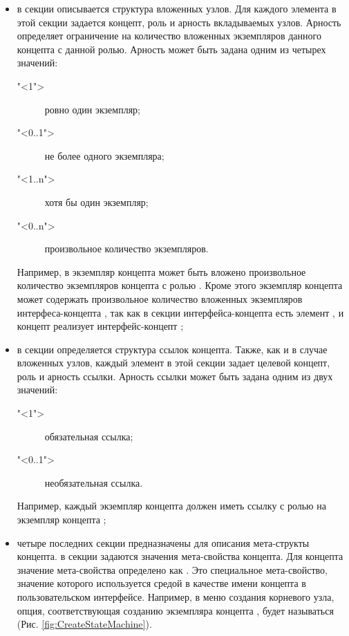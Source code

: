 \begin{itemize}
 \item в секции  описывается структура вложенных узлов. Для каждого элемента в этой секции задается концепт, роль и арность вкладываемых узлов. Арность определяет ограничение на количество вложенных экземпляров данного концепта с данной ролью. Арность может быть задана одним из четырех значений:
\begin{description}
 \item["<1">] ровно один экземпляр;
 \item["<0..1">] не более одного экземпляра;
 \item["<1..n">] хотя бы один экземпляр;
 \item["<0..n">] произвольное количество экземпляров.
\end{description}
Например, в экземпляр концепта  может быть вложено произвольное количество экземпляров концепта  с ролью . Кроме этого экземпляр концепта  может содержать произвольное количество вложенных экземпляров интерфеса-концепта , так как в секции  интерфейса-концепта  есть элемент , и концепт  реализует интерфейс-концепт ;

\item в секции  определяется структура ссылок концепта. Также, как и в случае вложенных узлов, каждый элемент в этой секции задает целевой концепт, роль и арность ссылки. Арность ссылки может быть задана одним из двух значений:
\begin{description}
 \item["<1">] обязательная ссылка;
 \item["<0..1">] необязательная ссылка.
\end{description}
Например, каждый экземпляр концепта  должен иметь ссылку с ролью  на экземпляр концепта ;

\item четыре последних секции предназначены для описания мета-структы концепта. в секции  задаются значения мета-свойства концепта. Для концепта  значение мета-свойства  определено как . Это специальное мета-свойство, значение которого используется средой \MPS{} в качестве имени концепта в пользовательском интерфейсе. Например, в меню создания корневого узла, опция, соответствующая созданию экземпляра концепта , будет называться  (Рис. \ref{fig:CreateStateMachine}).


\end{itemize}
